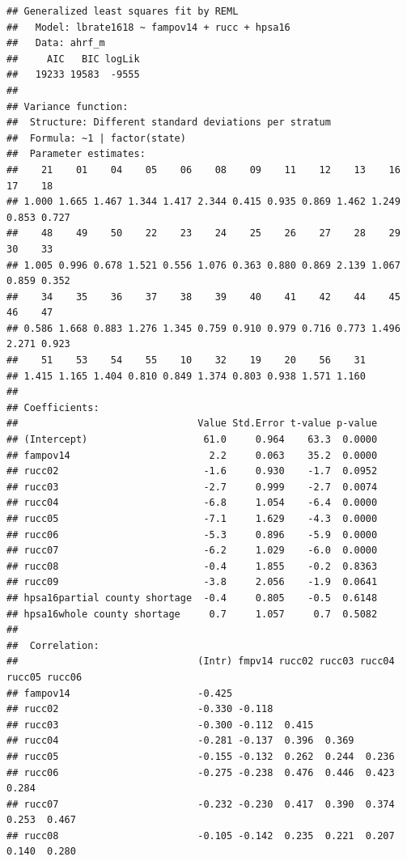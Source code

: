 \documentclass[
]{article}
\begin{document}
\begin{verbatim}
## Generalized least squares fit by REML
##   Model: lbrate1618 ~ fampov14 + rucc + hpsa16 
##   Data: ahrf_m 
##     AIC   BIC logLik
##   19233 19583  -9555
## 
## Variance function:
##  Structure: Different standard deviations per stratum
##  Formula: ~1 | factor(state) 
##  Parameter estimates:
##    21    01    04    05    06    08    09    11    12    13    16    17    18 
## 1.000 1.665 1.467 1.344 1.417 2.344 0.415 0.935 0.869 1.462 1.249 0.853 0.727 
##    48    49    50    22    23    24    25    26    27    28    29    30    33 
## 1.005 0.996 0.678 1.521 0.556 1.076 0.363 0.880 0.869 2.139 1.067 0.859 0.352 
##    34    35    36    37    38    39    40    41    42    44    45    46    47 
## 0.586 1.668 0.883 1.276 1.345 0.759 0.910 0.979 0.716 0.773 1.496 2.271 0.923 
##    51    53    54    55    10    32    19    20    56    31 
## 1.415 1.165 1.404 0.810 0.849 1.374 0.803 0.938 1.571 1.160 
## 
## Coefficients:
##                               Value Std.Error t-value p-value
## (Intercept)                    61.0     0.964    63.3  0.0000
## fampov14                        2.2     0.063    35.2  0.0000
## rucc02                         -1.6     0.930    -1.7  0.0952
## rucc03                         -2.7     0.999    -2.7  0.0074
## rucc04                         -6.8     1.054    -6.4  0.0000
## rucc05                         -7.1     1.629    -4.3  0.0000
## rucc06                         -5.3     0.896    -5.9  0.0000
## rucc07                         -6.2     1.029    -6.0  0.0000
## rucc08                         -0.4     1.855    -0.2  0.8363
## rucc09                         -3.8     2.056    -1.9  0.0641
## hpsa16partial county shortage  -0.4     0.805    -0.5  0.6148
## hpsa16whole county shortage     0.7     1.057     0.7  0.5082
## 
##  Correlation: 
##                               (Intr) fmpv14 rucc02 rucc03 rucc04 rucc05 rucc06
## fampov14                      -0.425                                          
## rucc02                        -0.330 -0.118                                   
## rucc03                        -0.300 -0.112  0.415                            
## rucc04                        -0.281 -0.137  0.396  0.369                     
## rucc05                        -0.155 -0.132  0.262  0.244  0.236              
## rucc06                        -0.275 -0.238  0.476  0.446  0.423  0.284       
## rucc07                        -0.232 -0.230  0.417  0.390  0.374  0.253  0.467
## rucc08                        -0.105 -0.142  0.235  0.221  0.207  0.140  0.280

\end{verbatim}
\end{document}
